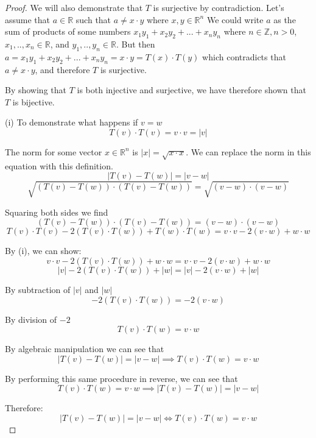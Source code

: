 \documentclass[a4paper]{article}
\begin{document}
\begin{myparindent}{0pt}
\begin{proof}
  We will also demonstrate that $T$ is surjective by contradiction. Let's assume
  that $a \in \mathbb{R}$ such that $a \neq x \cdot y$ where
  $x, y \in \mathbb{R}^n$ We could write $a$ as the sum of products of some numbers
  $x_1y_1 + x_2y_2 + ... + x_ny_n$ where $n \in \mathbb{Z}, n > 0$,
  $x_1, .., x_n \in \mathbb{R}$, and $y_1, .., y_n \in \mathbb{R}$.
  But then $a = x_1y_1 + x_2y_2 + ... + x_ny_n = x \cdot y = T(x) \cdot T(y)$
  which contradicts that $a \neq x \cdot y$, and therefore $T$ is surjective.
  \newline

  By showing that $T$ is both injective and surjective, we have therefore shown
  that $T$ is bijective. \newline

  (i) To demonstrate what happens if $v = w$
  \[ T(v) \cdot T(v) = v \cdot v = |v| \]

  The norm for some vector $x \in \mathbb{R}^n$ is $|x| = \sqrt{x \cdot x}$.
  We can replace the norm in this equation with this definition.
  \[ |T(v) - T(w)| = |v - w| \]
  \[ \sqrt{(T(v) - T(w)) \cdot (T(v) - T(w))} = \sqrt{(v - w) \cdot (v - w)} \]

  Squaring both sides we find
  \[ (T(v) - T(w)) \cdot (T(v) - T(w)) = (v - w) \cdot (v - w) \]
  \[ T(v) \cdot T(v) - 2(T(v) \cdot T(w)) + T(w) \cdot T(w) = v \cdot v - 2(v \cdot w) + w \cdot w \]

  By (i), we can show:
  \[ v \cdot v - 2(T(v) \cdot T(w)) + w \cdot w = v \cdot v - 2(v \cdot w) + w \cdot w \]
  \[ |v| - 2(T(v) \cdot T(w)) + |w| = |v| - 2(v \cdot w) + |w| \]

  By subtraction of $|v|$ and $|w|$
  \[ - 2(T(v) \cdot T(w)) = - 2(v \cdot w) \]

  By division of $-2$
  \[ T(v) \cdot T(w) = v \cdot w \]

  By algebraic manipulation we can see that
  \[ |T(v) - T(w)| = |v - w| \implies T(v) \cdot T(w) = v \cdot w \]

  By performing this same procedure in reverse, we can see that
  \[ T(v) \cdot T(w) = v \cdot w \implies |T(v) - T(w)| = |v - w| \]

  Therefore:
  \[ |T(v) - T(w)| = |v - w| \iff T(v) \cdot T(w) = v \cdot w \]


\end{proof}

\end{myparindent}
\end{document}
